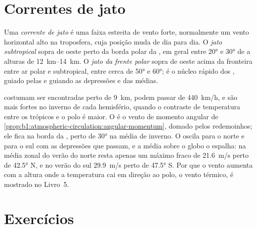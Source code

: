 \section{Correntes de jato}\label{sec:b1:atmospheric-circulation:jets}

\begin{definition}\label{def:b1:atmospheric-circulation:jet}
Uma \emph{corrente de jato} é uma faixa estreita de vento forte, normalmente um
vento horizontal alto na troposfera, cuja posição muda de dia para dia. O \emph{jato subtropical}
sopra de oeste perto da borda polar da , em geral entre \ang{20} e \ang{30} de 
a alturas de \qtyrange{12}{14}{km}. O \emph{jato da frente polar} sopra
de oeste acima da fronteira entre ar polar e subtropical, entre cerca de \ang{50} e \ang{60}; é o núcleo
rápido dos , guiado pelas e guiando as depressões e  das  médias.
\end{definition}

 costumam ser encontradas perto de \qty{9}{km}, podem passar de \qty{440}{km/h}, e
são mais fortes no inverno de cada hemisfério, quando o contraste de temperatura entre os trópicos e o
polo é maior. O  é o vento de momento angular de
\cref{prop:b1:atmospheric-circulation:angular-momentum}, domado pelos redemoinhos; ele fica na borda da
, perto de \ang{30} na média de inverno. O  oscila para o norte e
para o sul com as depressões que passam, e a média sobre o globo o espalha: na média zonal do verão do
norte resta apenas um máximo fraco de \qty{21.6}{m/s} perto de \ang{42.5} N, e no verão do sul
\qty{29.9}{m/s} perto de \ang{47.5} S. Por que o vento aumenta com a altura onde a temperatura cai em
direção ao polo, o vento térmico, é mostrado no Livro~5.

\section{Exercícios}

